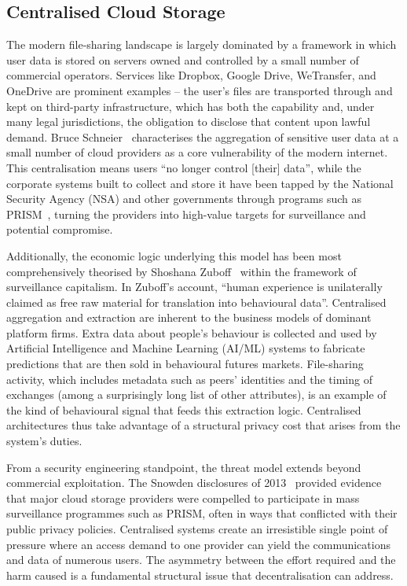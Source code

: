 \documentclass[12pt,a4paper,oneside]{report}
\begin{document}
\subsection{Centralised Cloud Storage}
\label{sec:centralised}

The modern file-sharing landscape is largely dominated by a framework in which user data is stored on servers owned and controlled by a small number of commercial operators. Services like Dropbox, Google Drive, WeTransfer, and OneDrive are prominent examples -- the user's files are transported through and kept on third-party infrastructure, which has both the capability and, under many legal jurisdictions, the obligation to disclose that content upon lawful demand. Bruce Schneier~\cite{schneier2015} characterises the aggregation of sensitive user data at a small number of cloud providers as a core vulnerability of the modern internet. This centralisation means users ``no longer control [their] data'', while the corporate systems built to collect and store it have been tapped by the National Security Agency (NSA) and other governments through programs such as PRISM~\cite{epicprism}, turning the providers into high-value targets for surveillance and potential compromise.

Additionally, the economic logic underlying this model has been most comprehensively theorised by Shoshana Zuboff~\cite{zuboff2019} within the framework of surveillance capitalism. In Zuboff's account, ``human experience is unilaterally claimed as free raw material for translation into behavioural data''. Centralised aggregation and extraction are inherent to the business models of dominant platform firms. Extra data about people's behaviour is collected and used by Artificial Intelligence and Machine Learning (AI/ML) systems to fabricate predictions that are then sold in behavioural futures markets. File-sharing activity, which includes metadata such as peers' identities and the timing of exchanges (among a surprisingly long list of other attributes), is an example of the kind of behavioural signal that feeds this extraction logic. Centralised architectures thus take advantage of a structural privacy cost that arises from the system's duties.

From a security engineering standpoint, the threat model extends beyond commercial exploitation. The Snowden disclosures of 2013~\cite{snowden2013} provided evidence that major cloud storage providers were compelled to participate in mass surveillance programmes such as PRISM, often in ways that conflicted with their public privacy policies. Centralised systems create an irresistible single point of pressure where an access demand to one provider can yield the communications and data of numerous users. The asymmetry between the effort required and the harm caused is a fundamental structural issue that decentralisation can address.
\end{document}
